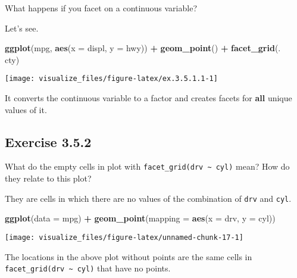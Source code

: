 \documentclass[]{book}
\newenvironment{Shaded}{\begin{snugshade}}{\end{snugshade}}
\newcommand{\DataTypeTok}[1]{\textcolor[rgb]{0.13,0.29,0.53}{#1}}
\newcommand{\KeywordTok}[1]{\textcolor[rgb]{0.13,0.29,0.53}{\textbf{#1}}}
\newcommand{\NormalTok}[1]{#1}
\newcommand{\OperatorTok}[1]{\textcolor[rgb]{0.81,0.36,0.00}{\textbf{#1}}}
\newcommand{\StringTok}[1]{\textcolor[rgb]{0.31,0.60,0.02}{#1}}
\theoremstyle{plain}
\theoremstyle{remark}
\theoremstyle{definition}
\theoremstyle{definition}
\theoremstyle{definition}
\theoremstyle{remark}
\begin{document}
What happens if you facet on a continuous variable?

Let's see.

\begin{Shaded}
\begin{Highlighting}[]
\KeywordTok{ggplot}\NormalTok{(mpg, }\KeywordTok{aes}\NormalTok{(}\DataTypeTok{x =}\NormalTok{ displ, }\DataTypeTok{y =}\NormalTok{ hwy)) }\OperatorTok{+}
\StringTok{  }\KeywordTok{geom_point}\NormalTok{() }\OperatorTok{+}
\StringTok{  }\KeywordTok{facet_grid}\NormalTok{(. }\OperatorTok{~}\StringTok{ }\NormalTok{cty)}
\end{Highlighting}
\end{Shaded}

\begin{center}\texttt{[image: visualize\_files/figure-latex/ex.3.5.1.1-1]} \end{center}

It converts the continuous variable to a factor and creates facets for
\textbf{all} unique values of it.

\hypertarget{exercise-3.5.2}{%
\subsection*{\texorpdfstring{Exercise
{3.5.2}}{Exercise 3.5.2}}\label{exercise-3.5.2}}

What do the empty cells in plot with
\texttt{facet\_grid(drv\ \textasciitilde{}\ cyl)} mean? How do they
relate to this plot?

They are cells in which there are no values of the combination of
\texttt{drv} and \texttt{cyl}.

\begin{Shaded}
\begin{Highlighting}[]
\KeywordTok{ggplot}\NormalTok{(}\DataTypeTok{data =}\NormalTok{ mpg) }\OperatorTok{+}
\StringTok{  }\KeywordTok{geom_point}\NormalTok{(}\DataTypeTok{mapping =} \KeywordTok{aes}\NormalTok{(}\DataTypeTok{x =}\NormalTok{ drv, }\DataTypeTok{y =}\NormalTok{ cyl))}
\end{Highlighting}
\end{Shaded}

\begin{center}\texttt{[image: visualize\_files/figure-latex/unnamed-chunk-17-1]} \end{center}

The locations in the above plot without points are the same cells in
\texttt{facet\_grid(drv\ \textasciitilde{}\ cyl)} that have no points.
\end{document}
